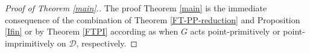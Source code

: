 \documentclass[a4paper,twopage,reqno,12pt]{amsart}
\newtheorem{proposition}[theorem]{Proposition}
\theoremstyle{definition}
\numberwithin{equation}{section}
\newcommand{\PSL}{\mathrm{PSL}}
\newcommand{\PGaL}{\mathrm{P\Gamma L}}
\renewcommand{\leq}{\leqslant}
\renewcommand{\geq}{\geqslant}
\begin{document}
\bigskip

\begin{proof}[Proof of Theorem \ref{main}.]
The proof Theorem \ref{main} is the immediate consequence of the combination of Theorem \ref{FT-PP-reduction} and Proposition \ref{Ifin} or by Theorem \ref{FTPI} according as when $G$ acts point-primitively or point-imprimitively on $\mathcal{D}$, respectively.  
\end{proof}

\end{document}
